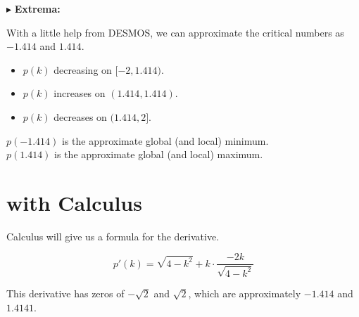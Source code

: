 \documentclass{ximera}
\begin{document}
$\blacktriangleright$ \textbf{\textcolor{blue!55!black}{Extrema:}}  


With a little help from DESMOS, we can approximate the critical numbers as $-1.414$ and $1.414$.



\begin{itemize}
\item  $p(k)$ decreasing on $[-2, 1.414)$.
\item  $p(k)$ increases on $(1.414, 1.414)$.
\item  $p(k)$ decreases on $(1.414, 2]$.
\end{itemize}




$p(-1.414)$ is the approximate global (and local) minimum. \\

$p(1.414)$ is the approximate global (and local) maximum. \\




\section{with Calculus}


Calculus will give us a formula for the derivative.

\[    p'(k) = \sqrt{4 - k^2} + k \cdot \frac{-2k}{\sqrt{4-k^2}}  \]


This derivative has zeros of $-\sqrt{2}$ and $\sqrt{2}$, which are approximately $-1.414$ and $1.4141$. 
\end{document}
